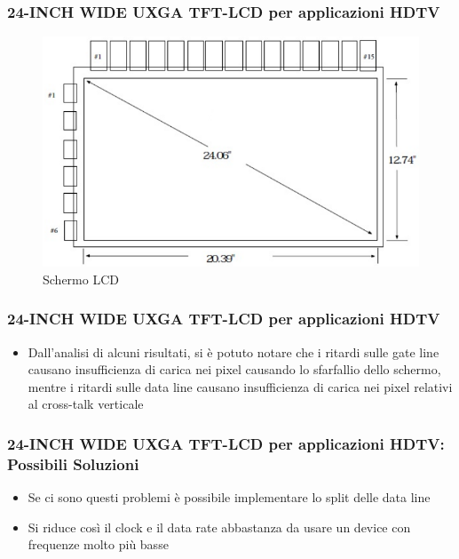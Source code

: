 \documentclass[12pt]{beamer}
\begin{document}
	\begin{frame}
		\frametitle{24-INCH WIDE UXGA TFT-LCD per applicazioni HDTV}
		\begin{figure}
			\centering
			\includegraphics[width=1\linewidth]{IMMAGINI/schermoLCD}
			\caption{Schermo LCD}
			\label{fig:schermolcd}
		\end{figure}
	\end{frame}
	\begin{frame}
		\frametitle{24-INCH WIDE UXGA TFT-LCD per applicazioni HDTV}
		\begin{itemize}
			\item Dall’analisi di alcuni risultati, si è potuto notare che i ritardi sulle gate line  causano insufficienza di carica nei pixel causando lo sfarfallio dello schermo, mentre i ritardi sulle data line causano insufficienza di carica nei pixel relativi al cross-talk verticale
		\end{itemize}
	\end{frame}
	\begin{frame}
	\frametitle{24-INCH WIDE UXGA TFT-LCD per applicazioni HDTV:  Possibili Soluzioni}
		\begin{itemize}
			\item Se ci sono questi problemi è possibile implementare lo split delle data line
			\pause
			\item Si riduce così il clock e il data rate abbastanza
			da usare un device con frequenze molto più basse
		\end{itemize}
	\end{frame}
\end{document}
